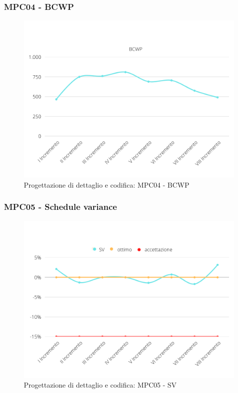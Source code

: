 \subsubsection{MPC04 - BCWP}
\begin{figure}[H]
    \centering
    \includegraphics[scale=0.50]{Sezioni/images/pdc-BCWP.png}
    \caption{Progettazione di dettaglio e codifica: MPC04 - BCWP}
\end{figure}

\subsubsection{MPC05 - Schedule variance}
\begin{figure}[H]
    \centering
    \includegraphics[scale=0.50]{Sezioni/images/pdc-SV.png}
    \caption{Progettazione di dettaglio e codifica: MPC05 - SV}
\end{figure}

